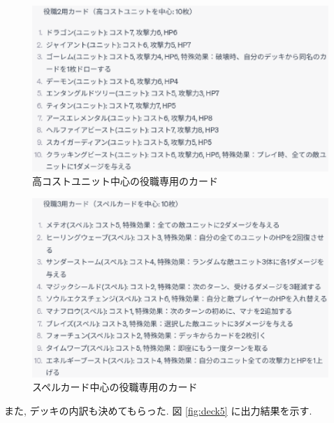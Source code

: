 \documentclass{jarticle}     %
\begin{document}
\begin{figure}[ht]
  \centering
  \includegraphics[width=120mm]{assets/3.eps}
  \vspace{-0.3cm}
  \caption{高コストユニット中心の役職専用のカード}
  \label{fig:deck3}
\end{figure}


\begin{figure}[ht]
  \centering
  \includegraphics[width=120mm]{assets/4.eps}
  \vspace{-0.3cm}
  \caption{スペルカード中心の役職専用のカード}
  \label{fig:deck4}
\end{figure}

また, デッキの内訳も決めてもらった.
図 \ref{fig:deck5} に出力結果を示す.
\end{document}
